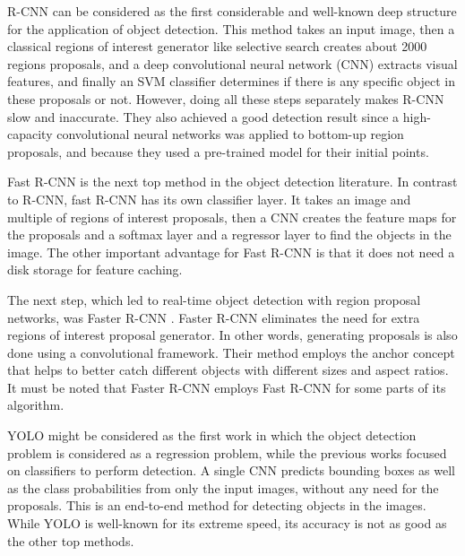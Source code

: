 \documentclass[conference]{IEEEtran}
\begin{document}
R-CNN \cite{RCNN} can be considered as the first considerable and well-known deep structure for the application of object detection. This method takes an input image, then a classical regions of interest generator like selective search \cite{selective} creates about 2000 regions proposals, and a deep convolutional neural network (CNN) extracts visual features, and finally an SVM classifier determines if there is any specific object in these proposals or not. However, doing all these steps separately makes R-CNN slow and inaccurate. They also achieved a good detection result since a high-capacity convolutional neural networks was applied to bottom-up region proposals, and because they used a pre-trained model for their initial points.

Fast R-CNN \cite{fastrcnn} is the next top method in the object detection literature. In contrast to R-CNN, fast R-CNN has its own classifier layer. It takes an image and multiple of regions of interest proposals, then a CNN creates the feature maps for the proposals and a softmax layer and a regressor layer to find the objects in the image. The other important advantage for Fast R-CNN is that it does not need a disk storage for feature caching. 

The next step, which led to real-time object detection with region proposal networks, was Faster R-CNN \cite{faster}. Faster R-CNN eliminates the need for extra regions of interest proposal generator. In other words, generating proposals is also done using a convolutional framework. Their method employs the anchor concept that helps to better catch different objects with different sizes and aspect ratios. It must be noted that Faster R-CNN employs Fast R-CNN for some parts of its algorithm. 

YOLO \cite{yolo} might be considered as the first work in which the object detection problem is considered as a regression problem, while the previous works focused on classifiers to perform detection. A single CNN predicts bounding boxes as well as the class probabilities from only the input images, without any need for the proposals. This is an end-to-end method for detecting objects in the images. While YOLO is well-known for its extreme speed, its accuracy is not as good as the other top methods.\\
\end{document}
